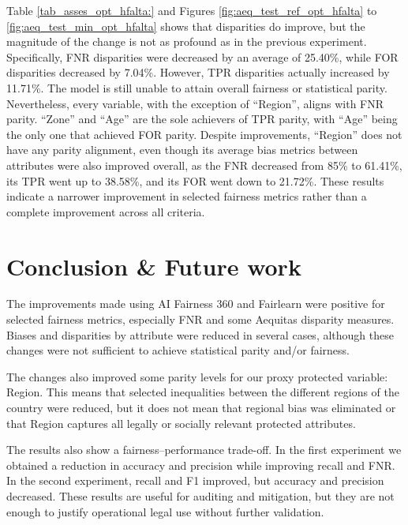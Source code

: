 \documentclass[fleqn,10pt]{wlscirep}
\begin{document}
 Table \ref{tab_asses_opt_hfalta:} and Figures \ref{fig:aeq_test_ref_opt_hfalta} to \ref{fig:aeq_test_min_opt_hfalta} shows that disparities do improve, but the magnitude of the change is not as profound as in the previous experiment. Specifically, FNR disparities were decreased by an average of 25.40\%, while FOR disparities decreased by 7.04\%. However, TPR disparities actually increased by 11.71\%. The model is still unable to attain overall fairness or statistical parity. Nevertheless, every variable, with the exception of ``Region'', aligns with FNR parity. ``Zone'' and ``Age'' are the sole achievers of TPR parity, with ``Age'' being the only one that achieved FOR parity. Despite improvements, ``Region'' does not have any parity alignment, even though its average bias metrics between attributes were also improved overall, as the FNR decreased from 85\% to 61.41\%, its TPR went up to 38.58\%, and its FOR went down to 21.72\%. These results indicate a narrower improvement in selected fairness metrics rather than a complete improvement across all criteria.





\section{Conclusion \& Future work}
\label{conclusion}

The improvements made using AI Fairness 360 and Fairlearn were positive for selected fairness metrics, especially FNR and some Aequitas disparity measures. Biases and disparities by attribute were reduced in several cases, although these changes were not sufficient to achieve statistical parity and/or fairness.

The changes also improved some parity levels for our proxy protected variable: Region. This means that selected inequalities between the different regions of the country were reduced, but it does not mean that regional bias was eliminated or that Region captures all legally or socially relevant protected attributes.

The results also show a fairness--performance trade-off. In the first experiment we obtained a reduction in accuracy and precision while improving recall and FNR. In the second experiment, recall and F1 improved, but accuracy and precision decreased. These results are useful for auditing and mitigation, but they are not enough to justify operational legal use without further validation.
\end{document}
